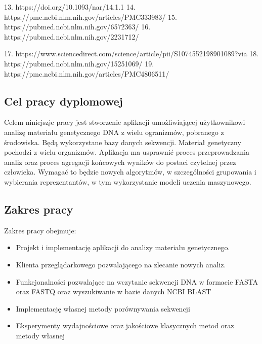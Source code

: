 13. https://doi.org/10.1093/nar/14.1.1
14. https://pmc.ncbi.nlm.nih.gov/articles/PMC333983/
15. https://pubmed.ncbi.nlm.nih.gov/6572363/
16. https://pubmed.ncbi.nlm.nih.gov/2231712/

17. https://www.sciencedirect.com/science/article/pii/S1074552198901089?via%
18. https://pubmed.ncbi.nlm.nih.gov/15251069/
19. https://pmc.ncbi.nlm.nih.gov/articles/PMC4806511/


    \subsection {
        Cel pracy dyplomowej
    }

    Celem niniejszje pracy jest stworzenie aplikacji umożliwiającej użytkownikowi
    analizę materiału genetycznego DNA z wielu ogranizmów, pobranego z środowiska.
    Będą wykorzystane bazy danych sekwencji.
    Materiał genetyczny pochodzi z wielu organizmów.
    Aplikacja ma usprawnić proces przeprowadzania analiz oraz proces 
    agregacji końcowych wyników do postaci czytelnej przez człowieka.
    Wymagać to będzie nowych algorytmów, w szczególności grupowania i wybierania reprezentantów,
    w tym wykorzystanie modeli uczenia maszynowego.

    \subsection {
        Zakres pracy
    }


        Zakres pracy obejmuje:
        \begin{itemize}
            \item Projekt i implementację aplikacji do analizy materiału genetycznego.
            \item Klienta przeglądarkowego pozwalającego na zlecanie nowych analiz.
            \item {
                Funkcjonalności pozwalające na wczytanie sekwencji DNA w formacie FASTA oraz FASTQ
                oraz wyszukiwanie w bazie danych NCBI BLAST
            }
            \item Implementację własnej metody porównywania sekwencji 
            \item Eksperymenty wydajnościowe oraz jakościowe klasycznych metod oraz metody własnej
        \end{itemize}

